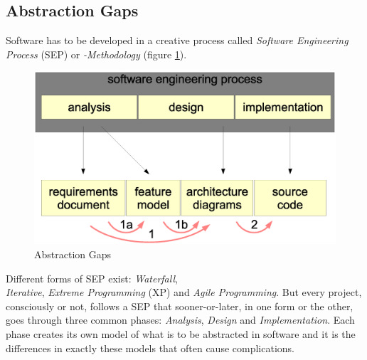 %
%
%
%
%
%
%

\subsection{Abstraction Gaps}
\label{abstraction_gaps_heading}

Software has to be developed in a creative process called
\emph{Software Engineering Process} (SEP) or \emph{-Methodology} (figure
\ref{gaps_figure}).

\begin{figure}[htb]
    \begin{center}
        \includegraphics[scale=0.2]{vector/gaps.eps}
        \caption{Abstraction Gaps}
        \label{gaps_figure}
    \end{center}
\end{figure}

Different forms of SEP exist: \emph{Waterfall},\\ \emph{Iterative},
\emph{Extreme Programming} (XP) and \emph{Agile Programming}. But every
project, consciously or not, follows a SEP that sooner-or-later, in one form or
the other, goes through three common phases: \emph{Analysis}, \emph{Design} and
\emph{Implementation}. Each phase creates its own model of what is to be
abstracted in software and it is the differences in exactly these models that
often cause complications.

